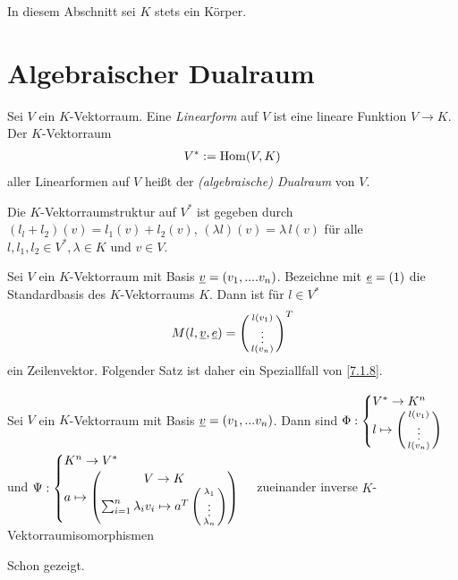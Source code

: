 \documentclass[../../main.tex]{subfiles}
\begin{document}
In diesem Abschnitt sei $K$ stets ein Körper.

\section{Algebraischer Dualraum}

\begin{df}\label{13.1.1} 
Sei $V$ ein $K$-Vektorraum. Eine \emph{Linearform} auf $V$ ist eine lineare Funktion $V\to K$. Der $K$-Vektorraum
\begin{align*}
V^*:=\operatorname{Hom}(V,K)
\end{align*}
aller Linearformen auf $V$ heißt der \emph{(algebraische) Dualraum} von $V$.
\end{df} 

\begin{er}\label{13.1.2}
Die $K$-Vektorraumstruktur auf $V^*$ ist gegeben durch
$(l_l+l_2)(v)=l_1(v)+l_2(v)$, $(\lambda l)(v)=\lambda\,l(v)$ für alle $l,l_1,l_2\in V^*, \lambda\in K$ und $v\in V$.
\end{er}

\begin{bem}\label{13.1.3}
Sei $V$ ein $K$-Vektorraum mit Basis ${\underline v}=(v_1,....v_n)$. Bezeichne mit ${\underline e}=(1)$ die Standardbasis des $K$-Vektorraums $K$.  Dann ist für $l\in V^*$
\begin{align*}
M(l,\underline{v},\underline{e})=\left(\begin{smallmatrix}l(v_1)\\\vdots\\l(v_n)\end{smallmatrix}\right)^T
\end{align*}
ein Zeilenvektor. Folgender Satz ist daher ein Speziallfall von \ref{7.1.8}.
\end{bem}

\begin{sat}\label{13.1.4}
Sei $V$ ein $K$-Vektorraum mit Basis ${\underline v}=(v_1,...v_n)$. Dann sind $\Phi: \begin{cases}V^*\to K^n\\l\mapsto \left(\begin{smallmatrix}l(v_1)\\\vdots\\l(v_n)\end{smallmatrix}\right)\end{cases}$ und $\Psi: \begin{cases}K^n\to V^*\\ a\mapsto\begin{pmatrix*}V\to K\\\sum_{i=1}^n\lambda_iv_i\mapsto a^T\cvec{\lambda_1\\\vdots\\\lambda_n}\end{pmatrix*}\end{cases}$ zueinander inverse $K$-Vektorraumisomorphismen
\end{sat}
\begin{cproof} Schon gezeigt.
\end{cproof}
	
\end{document}
